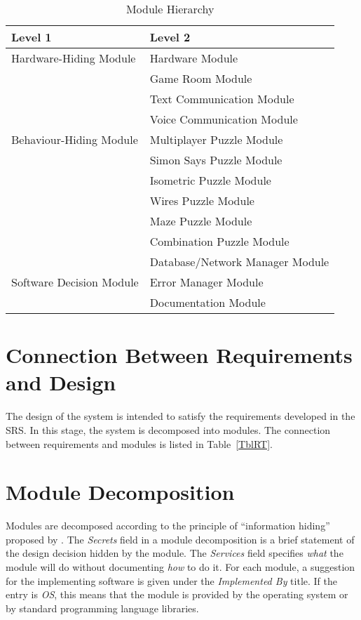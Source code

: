 \documentclass[12pt, titlepage]{article}
\begin{document}
\begin{table}[ht!]
\centering
\begin{tabular}{p{} p{}}
\toprule
\textbf{Level 1} & \textbf{Level 2}\\
\midrule

{Hardware-Hiding Module} & Hardware Module \\
\midrule

\multirow{7}{0.3\textwidth}{Behaviour-Hiding Module}
& Game Room Module\\
& Text Communication Module\\
& Voice Communication Module\\
& Multiplayer Puzzle Module\\
& Simon Says Puzzle Module\\
& Isometric Puzzle Module\\
& Wires Puzzle Module\\
& Maze Puzzle Module\\
& Combination Puzzle Module\\
\midrule

\multirow{3}{0.3\textwidth}{Software Decision Module} & Database/Network Manager Module\\
& Error Manager Module\\
& Documentation Module\\
\bottomrule

\end{tabular}
\caption{Module Hierarchy}
\label{TblMH}
\end{table}

\newpage
\section{Connection Between Requirements and Design} \label{SecConnection}

The design of the system is intended to satisfy the requirements developed in
the SRS. In this stage, the system is decomposed into modules. The connection
between requirements and modules is listed in Table~\ref{TblRT}.

\section{Module Decomposition} \label{SecMD}

Modules are decomposed according to the principle of ``information hiding''
proposed by \citet{ParnasEtAl1984}. The \emph{Secrets} field in a module
decomposition is a brief statement of the design decision hidden by the
module. The \emph{Services} field specifies \emph{what} the module will do
without documenting \emph{how} to do it. For each module, a suggestion for the
implementing software is given under the \emph{Implemented By} title. If the
entry is \emph{OS}, this means that the module is provided by the operating
system or by standard programming language libraries.
\end{document}
